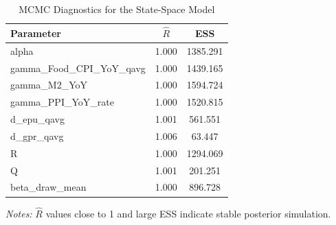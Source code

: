 \begin{table}[!htbp]
\centering
\begin{threeparttable}
 \caption{MCMC Diagnostics for the State-Space Model}
 \label{tab:mcmc_diagnostics}
\begin{tabular}{lcc}
\toprule
Parameter & $\widehat{R}$ & ESS \\
\midrule
alpha & 1.000 & 1385.291 \\
gamma\_Food\_CPI\_YoY\_qavg & 1.000 & 1439.165 \\
gamma\_M2\_YoY & 1.000 & 1594.724 \\
gamma\_PPI\_YoY\_rate & 1.000 & 1520.815 \\
d\_epu\_qavg & 1.001 & 561.551 \\
d\_gpr\_qavg & 1.006 & 63.447 \\
\addlinespace
R & 1.000 & 1294.069 \\
Q & 1.001 & 201.251 \\
\addlinespace
beta\_draw\_mean & 1.000 & 896.728 \\
\bottomrule
\end{tabular}
\begin{tablenotes}[flushleft]
\footnotesize
\item \textit{Notes:} $\widehat{R}$ values close to 1 and large ESS indicate stable posterior simulation.
\end{tablenotes}
\end{threeparttable}
\end{table}
